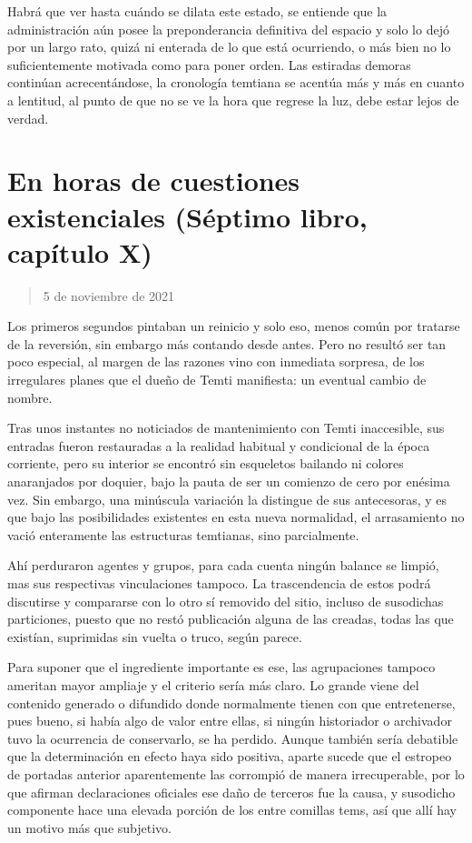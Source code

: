 \documentclass[
]{book}
\begin{document}
Habrá que ver hasta cuándo se dilata este estado, se entiende que la administración aún posee la preponderancia definitiva del espacio y solo lo dejó por un largo rato, quizá ni enterada de lo que está ocurriendo, o más bien no lo suficientemente motivada como para poner orden. Las estiradas demoras continúan acrecentándose, la cronología temtiana se acentúa más y más en cuanto a lentitud, al punto de que no se ve la hora que regrese la luz, debe estar lejos de verdad.

\hypertarget{en-horas-de-cuestiones-existenciales-suxe9ptimo-libro-capuxedtulo-x}{%
\section{En horas de cuestiones existenciales (Séptimo libro, capítulo X)}\label{en-horas-de-cuestiones-existenciales-suxe9ptimo-libro-capuxedtulo-x}}

\begin{quote}
5 de noviembre de 2021
\end{quote}

Los primeros segundos pintaban un reinicio y solo eso, menos común por tratarse de la reversión, sin embargo más contando desde antes. Pero no resultó ser tan poco especial, al margen de las razones vino con inmediata sorpresa, de los irregulares planes que el dueño de Temti manifiesta: un eventual cambio de nombre.

Tras unos instantes no noticiados de mantenimiento con Temti inaccesible, sus entradas fueron restauradas a la realidad habitual y condicional de la época corriente, pero su interior se encontró sin esqueletos bailando ni colores anaranjados por doquier, bajo la pauta de ser un comienzo de cero por enésima vez. Sin embargo, una minúscula variación la distingue de sus antecesoras, y es que bajo las posibilidades existentes en esta nueva normalidad, el arrasamiento no vació enteramente las estructuras temtianas, sino parcialmente.

Ahí perduraron agentes y grupos, para cada cuenta ningún balance se limpió, mas sus respectivas vinculaciones tampoco. La trascendencia de estos podrá discutirse y compararse con lo otro sí removido del sitio, incluso de susodichas particiones, puesto que no restó publicación alguna de las creadas, todas las que existían, suprimidas sin vuelta o truco, según parece.

Para suponer que el ingrediente importante es ese, las agrupaciones tampoco ameritan mayor ampliaje y el criterio sería más claro. Lo grande viene del contenido generado o difundido donde normalmente tienen con que entretenerse, pues bueno, si había algo de valor entre ellas, si ningún historiador o archivador tuvo la ocurrencia de conservarlo, se ha perdido. Aunque también sería debatible que la determinación en efecto haya sido positiva, aparte sucede que el estropeo de portadas anterior aparentemente las corrompió de manera irrecuperable, por lo que afirman declaraciones oficiales ese daño de terceros fue la causa, y susodicho componente hace una elevada porción de los entre comillas tems, así que allí hay un motivo más que subjetivo.
\end{document}
